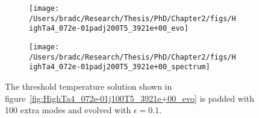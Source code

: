 \documentclass[../PhD.tex]{subfiles}
\begin{document}
\begin{figure}[ht]
	\centering
	\begin{subfigure}[t]{0.45\textwidth}
		\texttt{[image: /Users/bradc/Research/Thesis/PhD/Chapter2/figs/HighTa4\_072e-01padj200T5\_3921e+00\_evo]}
	\end{subfigure}
	\;
	\begin{subfigure}[t]{0.45\textwidth}
		\texttt{[image: /Users/bradc/Research/Thesis/PhD/Chapter2/figs/HighTa4\_072e-01padj200T5\_3921e+00\_spectrum]}
	\end{subfigure}
	\caption[Evolution of the spectrum of a threshold temperature solution that has been padded with $100$ modes]{The threshold temperature solution shown in figure~\ref{fig:HighTa4_072e-01j100T5_3921e+00_evo} is padded with 100 extra modes and evolved with $\epsilon = 0.1$.}
	\label{fig: HighTa4_072e-01padj200T5_3921e+00_evo}
\end{figure}

\end{document}
